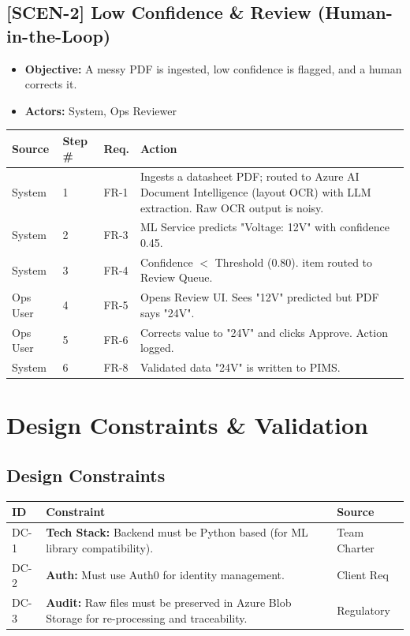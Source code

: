 \documentclass[12pt, a4paper]{article}
\begin{document}
\subsection*{[SCEN-2] Low Confidence \& Review (Human-in-the-Loop)}
\begin{itemize}
    \item \textbf{Objective:} A messy PDF is ingested, low confidence is flagged, and a human corrects it.
    \item \textbf{Actors:} System, Ops Reviewer
\end{itemize}

\begin{longtable}{@{}llp{2cm}p{8cm}@{}}
\toprule
\textbf{Source} & \textbf{Step \#} & \textbf{Req.} & \textbf{Action} \\
\midrule
System & 1 & FR-1 & Ingests a datasheet PDF; routed to Azure AI Document Intelligence (layout OCR) with LLM extraction. Raw OCR output is noisy. \\
System & 2 & FR-3 & ML Service predicts "Voltage: 12V" with confidence 0.45. \\
System & 3 & FR-4 & Confidence $<$ Threshold (0.80). item routed to Review Queue. \\
Ops User & 4 & FR-5 & Opens Review UI. Sees "12V" predicted but PDF says "24V". \\
Ops User & 5 & FR-6 & Corrects value to "24V" and clicks Approve. Action logged. \\
System & 6 & FR-8 & Validated data "24V" is written to PIMS. \\
\bottomrule
\end{longtable}

\newpage
\section{Design Constraints \& Validation}

\subsection{Design Constraints}
\begin{tabular}{@{}l >{\raggedright\arraybackslash}p{10.5cm} >{\raggedright\arraybackslash}p{3.5cm}@{}}
\toprule
\textbf{ID} & \textbf{Constraint} & \textbf{Source} \\
\midrule
DC-1 & \textbf{Tech Stack:} Backend must be Python based (for ML library compatibility). & Team Charter \\
\addlinespace
DC-2 & \textbf{Auth:} Must use Auth0 for identity management. & Client Req \\
\addlinespace
DC-3 & \textbf{Audit:} Raw files must be preserved in Azure Blob Storage for re-processing and traceability. & Regulatory \\
\bottomrule
\end{tabular}
\end{document}
